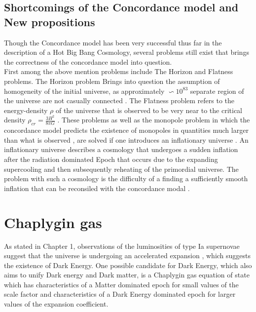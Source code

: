 \documentclass[a4paper, 11pt]{FSKH_623_Report}
\numberwithin{equation}{section}
\begin{document}
\section{Shortcomings of the Concordance model and New propositions}
Though the Concordance model has been very successful thus far in the description of a Hot Big Bang Cosmology, several problems still exist that brings the correctness of the concordance model into question. \\
First among the above mention problems include The Horizon and Flatness problems. The Horizon problem Brings into question the assumption of homogeneity of the initial universe, as approximately $\backsim 10^{83}$ separate region of the universe are not casually connected \citep{IU}. The Flatness problem refers to the   energy-density $\rho$ of the universe that is observed to be very near to the critical density $\rho_{cr}=\frac{3H^{2}}{8\pi G}$ \citep{GRES, IU}. These problems as well as the monopole problem in which the concordance model predicts the existence of monopoles in quantities much larger than what is observed , are solved if one introduces an inflationary universe \citep{IU}. An inflationary universe describes a cosmology that undergoes a sudden inflation after the radiation dominated Epoch that occurs due to the expanding supercooling and then subsequently reheating of the primordial universe. The problem with such a cosmology is the difficulty of a finding a sufficiently smooth inflation that can be reconsiled with the concordance modal \citep{IU}.\\

\chapter{Chaplygin gas}
As stated in Chapter 1, observations of the luminosities of type Ia supernovae suggest that the universe is undergoing an accelerated expansion \citep{NPSNe, RMCGAU}, which suggests the existence of Dark Energy. One possible candidate for Dark Energy, which also aims to unify Dark energy and Dark matter, is a Chaplygin gas equation of state which has characteristics of a Matter dominated epoch for small values of the scale factor and characteristics of a Dark Energy dominated epoch for larger values of the expansion coefficient.
\end{document}
